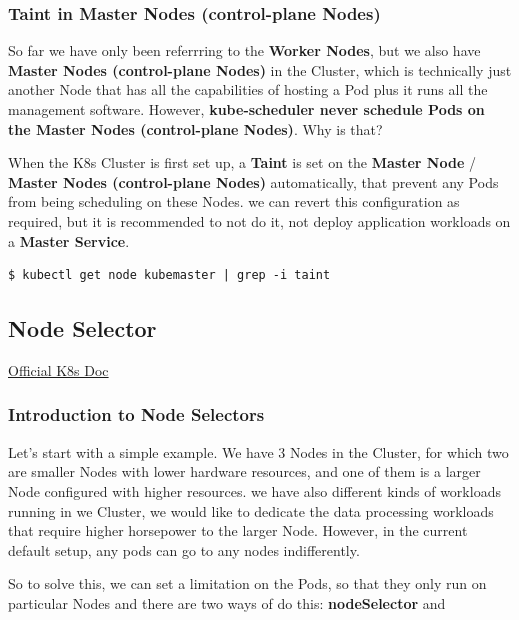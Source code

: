 \documentclass{article}
\newenvironment{codetemplate}[1][]{%
  \mybasecolorbox[#1]
  \itshape
}{%
  \endmybasecolorbox
}
\begin{document}
\subsubsection{Taint in Master Nodes (control-plane Nodes)}

So far we have only been referrring to the \textbf{Worker Nodes}, but we also have \textbf{Master Nodes (control-plane Nodes)} in the Cluster, which is technically just another Node that has all the capabilities of hosting a Pod plus it runs all the management software. However, \textbf{kube-scheduler never schedule Pods on the Master Nodes (control-plane Nodes)}. Why is that?

When the K8s Cluster is first set up, a \textbf{Taint} is set on the \textbf{Master Node} / \textbf{Master Nodes (control-plane Nodes)} automatically, that prevent any Pods from being scheduling on these Nodes. we can revert this configuration as required, but it is recommended to not do it, not deploy application workloads on a \textbf{Master Service}.

\begin{codetemplate}{}
\begin{verbatim}
$ kubectl get node kubemaster | grep -i taint
\end{verbatim}
\end{codetemplate}

\subsection{Node Selector}

\href{https://kubernetes.io/docs/concepts/scheduling-eviction/assign-pod-node/}{Official K8s Doc}

\subsubsection{Introduction to Node Selectors}

Let's start with a simple example. We have 3 Nodes in the Cluster, for which two are smaller Nodes with lower hardware resources, and one of them is a larger Node configured with higher resources. we have also different kinds of workloads running in we Cluster, we would like to dedicate the data processing workloads that require higher horsepower to the larger Node. However, in the current default setup, any pods can go to any nodes indifferently.

So to solve this, we can set a limitation on the Pods, so that they only run on particular Nodes and there are two ways of do this: \textbf{nodeSelector} and
\end{document}
